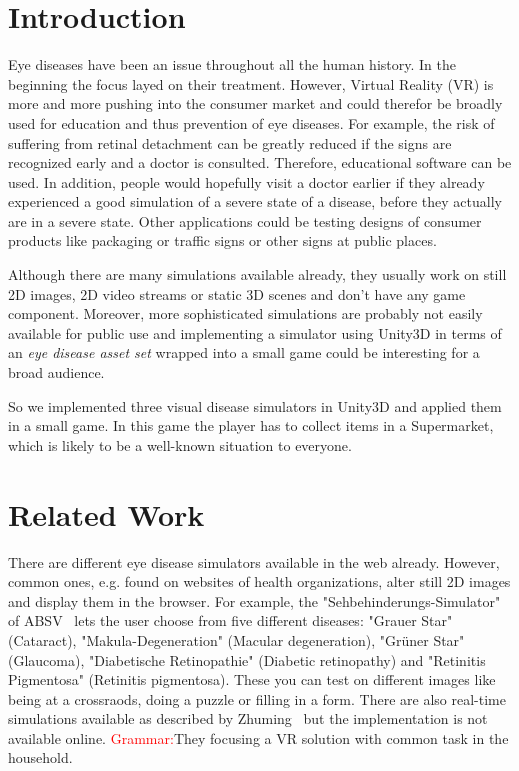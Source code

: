 \documentclass{sig-alternate-05-2015}
\newcommand{\todo}[1]{\textcolor{Red}{#1}}
\begin{document}
\section{Introduction}
Eye diseases have been an issue throughout all the human history.
In the beginning the focus layed on their treatment.
However, Virtual Reality (VR) is more and more pushing into the consumer market and could therefor be broadly used for education and thus prevention of eye diseases.
For example, the risk of suffering from retinal detachment can be greatly reduced if the signs are recognized early and a doctor is consulted.
Therefore, educational software can be used.
In addition, people would hopefully visit a doctor earlier if they already experienced a good simulation of a severe state of a disease, before they actually are in a severe state.
Other applications could be testing designs of consumer products like packaging or traffic signs or other signs at public places.

Although there are many simulations available already, they usually work on still 2D images, 2D video streams or static 3D scenes and don't have any game component.
Moreover, more sophisticated simulations are probably not easily available for public use and implementing a simulator using Unity3D in terms of an \emph{eye disease asset set} wrapped into a small game could be interesting for a broad audience.

So we implemented three visual disease simulators in Unity3D and applied them in a small game.
In this game the player has to collect items in a Supermarket, which is likely to be a well-known situation to everyone.

\section{Related Work}
There are different eye disease simulators available in the web already.
However, common ones, e.g. found on websites of health organizations, alter still 2D images and display them in the browser.
For example, the "Sehbehinderungs-Simulator" of ABSV~\cite{absv} lets the user choose from five different diseases: "Grauer Star" (Cataract), "Makula-Degeneration" (Macular degeneration), "Grüner Star" (Glaucoma), "Diabetische Retinopathie" (Diabetic retinopathy) and "Retinitis Pigmentosa" (Retinitis pigmentosa).
These you can test on different images like being at a crossraods, doing a puzzle or filling in a form. 
There are also real-time simulations available as described by Zhuming~\cite{eyediseasesim-zhuming} but the implementation is not available online.
\todo{Grammar:}They focusing a VR solution with common task in the household.
\end{document}
